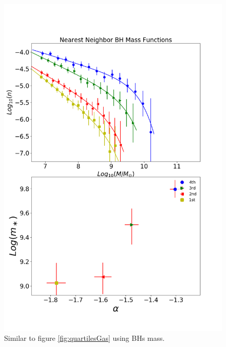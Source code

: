 \documentclass[a4paper,fleqn,usenatbib]{mnras}
\begin{document}
\begin{figure}
	\includegraphics[width=\columnwidth]{./pics/F19_quartilesBH.png}
    \caption{Similar to figure \ref{fig:quartilesGas} using BHs mass.} 
    \label{fig:quartilesBH}
\end{figure}
\end{document}
